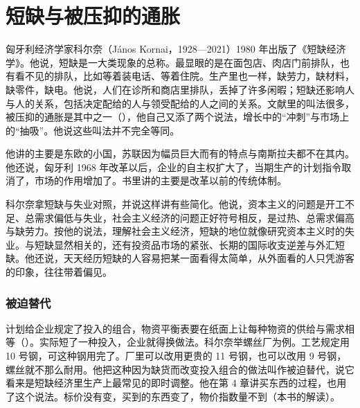 \section{短缺与被压抑的通胀}\label{sec:planned-shortage}

匈牙利经济学家科尔奈（János Kornai，1928—2021）1980 年出版了《短缺经济学》\cite{kornai1980,loc43,gnd43}。他说，短缺是一大类现象的总称\cite{kornai1980}。最显眼的是在面包店、肉店门前排队，也有看不见的排队，比如等着装电话、等着住院\cite{kornai1980}。生产里也一样，缺劳力，缺材料，缺零件，缺电\cite{kornai1980}。他说，人们在诊所和商店里排队，丢掉了许多闲暇；短缺还影响人与人的关系，包括决定配给的人与领受配给的人之间的关系\cite{kornai1980}。文献里的叫法很多，被压抑的通胀是其中之一（），他自己又添了两个说法，增长中的“冲刺”与市场上的“抽吸”\cite{kornai1980}。他说这些叫法并不完全等同\cite{kornai1980}。

他讲的主要是东欧的小国，苏联因为幅员巨大而有的特点与南斯拉夫都不在其内\cite{kornai1980}。他还说，匈牙利 1968 年改革以后，企业的自主权扩大了，当期生产的计划指令取消了，市场的作用增加了\cite{kornai1980}。书里讲的主要是改革以前的传统体制\cite{kornai1980}。

科尔奈拿短缺与失业对照，并说这样讲有些简化。他说，资本主义的问题是开工不足、总需求偏低与失业，社会主义经济的问题正好符号相反，是过热、总需求偏高与缺劳力\cite{kornai1980}。按他的说法，理解社会主义经济，短缺的地位就像研究资本主义时的失业\cite{kornai1980}。与短缺显然相关的，还有投资品市场的紧张、长期的国际收支逆差与外汇短缺\cite{kornai1980}。他还说，天天经历短缺的人容易把某一面看得太简单，从外面看的人只凭游客的印象，往往带着偏见\cite{kornai1980}。

\subsubsection{被迫替代}

计划给企业规定了投入的组合，物资平衡表要在纸面上让每种物资的供给与需求相等（）。实际短了一种投入，企业就得换做法。科尔奈举螺丝厂为例。工艺规定用 10 号钢，可这种钢用完了\cite{kornai1980}。厂里可以改用更贵的 11 号钢，也可以改用 9 号钢，螺丝就不那么耐用\cite{kornai1980}。他把这种因为缺货而改变投入组合的做法叫作被迫替代，说它看来是短缺经济里生产上最常见的即时调整\cite{kornai1980}。他在第 4 章讲买东西的过程，也用了这个说法\cite{kornai1980}。标价没有变，买到的东西变了，物价指数量不到（本书的解读）。


